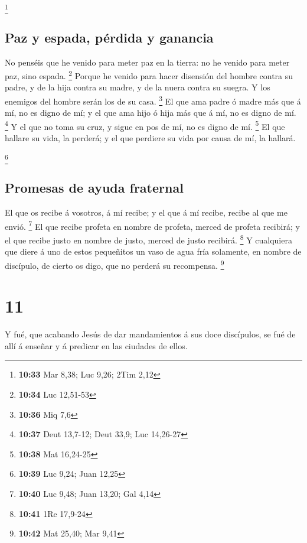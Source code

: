 \footnote{\textbf{10:33} Mar 8,38; Luc 9,26; 2Tim 2,12}

\hypertarget{paz-y-espada-puxe9rdida-y-ganancia}{%
\subsection{Paz y espada, pérdida y
ganancia}\label{paz-y-espada-puxe9rdida-y-ganancia}}

 No penséis que he venido para meter paz en la tierra: no
he venido para meter paz, sino espada. \footnote{\textbf{10:34} Luc
  12,51-53}  Porque he venido para hacer disensión del
hombre contra su padre, y de la hija contra su madre, y de la nuera
contra su suegra.  Y los enemigos del hombre serán los de
su casa. \footnote{\textbf{10:36} Miq 7,6}  El que ama
padre ó madre más que á mí, no es digno de mí; y el que ama hijo ó hija
más que á mí, no es digno de mí. \footnote{\textbf{10:37} Deut 13,7-12;
  Deut 33,9; Luc 14,26-27}  Y el que no toma su cruz, y
sigue en pos de mí, no es digno de mí. \footnote{\textbf{10:38} Mat
  16,24-25}  El que hallare su vida, la perderá; y el que
perdiere su vida por causa de mí, la hallará.

\footnote{\textbf{10:39} Luc 9,24; Juan 12,25}

\hypertarget{promesas-de-ayuda-fraternal}{%
\subsection{Promesas de ayuda
fraternal}\label{promesas-de-ayuda-fraternal}}

 El que os recibe á vosotros, á mí recibe; y el que á mí
recibe, recibe al que me envió. \footnote{\textbf{10:40} Luc 9,48; Juan
  13,20; Gal 4,14}  El que recibe profeta en nombre de
profeta, merced de profeta recibirá; y el que recibe justo en nombre de
justo, merced de justo recibirá. \footnote{\textbf{10:41} 1Re 17,9-24}
 Y cualquiera que diere á uno de estos pequeñitos un vaso
de agua fría solamente, en nombre de discípulo, de cierto os digo, que
no perderá su recompensa. \footnote{\textbf{10:42} Mat 25,40; Mar 9,41}

\hypertarget{section-10}{%
\section{11}\label{section-10}}

 Y fué, que acabando Jesús de dar mandamientos á sus doce
discípulos, se fué de allí á enseñar y á predicar en las ciudades de
ellos.

